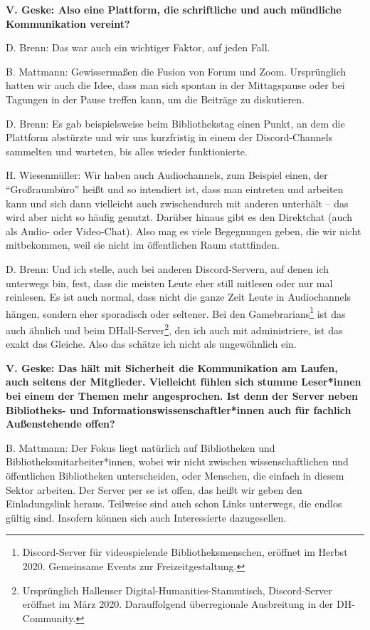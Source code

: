\documentclass[a4paper,
fontsize=11pt,
oneside,
numbers=noperiodatend,
parskip=half-,
bibliography=totoc,
final
]{scrartcl}
\begin{document}
\textbf{V. Geske: Also eine Plattform, die schriftliche und auch
mündliche Kommunikation vereint?}

D. Brenn: Das war auch ein wichtiger Faktor, auf jeden Fall.

B. Mattmann: Gewissermaßen die Fusion von Forum und Zoom. Ursprünglich
hatten wir auch die Idee, dass man sich spontan in der Mittagspause oder
bei Tagungen in der Pause treffen kann, um die Beiträge zu diskutieren.

D. Brenn: Es gab beispielsweise beim Bibliothekstag einen Punkt, an dem
die Plattform abstürzte und wir uns kurzfristig in einem der
Discord-Channels sammelten und warteten, bis alles wieder funktionierte.

H. Wiesenmüller: Wir haben auch Audiochannels, zum Beispiel einen, der
\enquote{Großraumbüro} heißt und so intendiert ist, dass man eintreten
und arbeiten kann und sich dann vielleicht auch zwischendurch mit
anderen unterhält -- das wird aber nicht so häufig genutzt. Darüber
hinaus gibt es den Direktchat (auch als Audio- oder Video-Chat). Also
mag es viele Begegnungen geben, die wir nicht mitbekommen, weil sie
nicht im öffentlichen Raum stattfinden.

D. Brenn: Und ich stelle, auch bei anderen Discord-Servern, auf denen
ich unterwegs bin, fest, dass die meisten Leute eher still mitlesen oder
nur mal reinlesen. Es ist auch normal, dass nicht die ganze Zeit Leute
in Audiochannels hängen, sondern eher sporadisch oder seltener. Bei den
Gamebrarians\footnote{Discord-Server für videospielende
  Bibliotheksmenschen, eröffnet im Herbst 2020. Gemeinsame Events zur
  Freizeitgestaltung.} ist das auch ähnlich und beim
DHall-Server\footnote{Ursprünglich Hallenser
  Digital-Humanities-Stammtisch, Discord-Server eröffnet im März 2020.
  Darauffolgend überregionale Ausbreitung in der DH-Community.}, den ich
auch mit administriere, ist das exakt das Gleiche. Also das schätze ich
nicht als ungewöhnlich ein.

\textbf{V. Geske: Das hält mit Sicherheit die Kommunikation am Laufen,
auch seitens der Mitglieder. Vielleicht fühlen sich stumme Leser*innen bei
einem der Themen mehr angesprochen. Ist denn der Server neben
Bibliotheks- und Informationswissenschaftler*innen auch für fachlich
Außenstehende offen?}

B. Mattmann: Der Fokus liegt natürlich auf Bibliotheken und
Bibliotheksmitarbeiter*innen, wobei wir nicht zwischen
wissenschaftlichen und öffentlichen Bibliotheken unterscheiden, oder
Menschen, die einfach in diesem Sektor arbeiten. Der Server per se ist
offen, das heißt wir geben den Einladungslink heraus. Teilweise sind
auch schon Links unterwegs, die endlos gültig sind. Insofern können sich
auch Interessierte dazugesellen.
\end{document}
